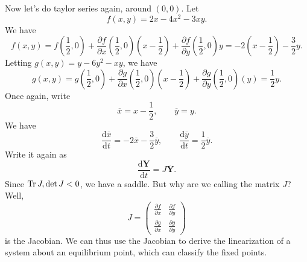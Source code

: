 Now let's do taylor series again, around $(0,0)$. Let
\[
	f(x,y)=2x-4x^2-3xy
.\]
We have
\[
	f(x,y)=f\left(\frac{1}{2},0\right)+\frac{\partial f}{\partial x} \left( \frac{1}{2},0 \right) \left( x-\frac{1}{2} \right) +\frac{\partial f}{\partial y} \left( \frac{1}{2},0 \right) y=-2\left( x-\frac{1}{2} \right) -\frac{3}{2}y
.\]
Letting $g(x,y)=y-6y^2-xy$, we have
\[
	g(x,y)=g\left( \frac{1}{2},0 \right) +\frac{\partial g}{\partial x} \left( \frac{1}{2},0 \right) \left( x-\frac{1}{2} \right) +\frac{\partial g}{\partial y} \left( \frac{1}{2},0 \right) \left( y \right) =\frac{1}{2}y
.\]
Once again, write
\[
	\overline{x} =x-\frac{1}{2},\qquad \overline{y} =y
.\]
We have
\[
	\frac{\mathrm{d}\overline{x} }{\mathrm{d}t} =-2\overline{x} -\frac{3}{2}\overline{y} ,\qquad \frac{\mathrm{d}\overline{y} }{\mathrm{d}t} =\frac{1}{2}\overline{y} 	
.\]
Write it again as
\[
	\frac{\mathrm{d}\mathbf{Y}}{\mathrm{d}t} =J \overline{\mathbf{Y}} 
.\]
Since $\operatorname{Tr} J,\det J<0$, we have a saddle. But why are we calling the matrix $J $? Well,
\[
	J=\begin{pmatrix}
		\frac{\partial f}{\partial x} &\frac{\partial f}{\partial y} \\
		\frac{\partial g}{\partial x} &\frac{\partial g}{\partial y} 
	\end{pmatrix} 
\]
is the Jacobian. We can thus use the Jacobian to derive the linearization of a system about an equilibrium point, which can classify the fixed points.
